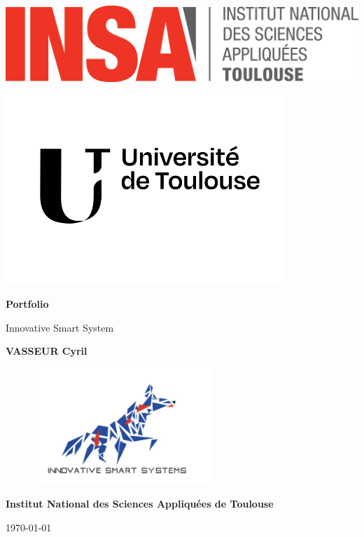 \documentclass[a4paper,12pt]{report}
\begin{document}
\raggedbottom
\begin{titlepage}
    \centering

    
    \noindent 
    \begin{minipage}{0.5\textwidth}
        \includegraphics[width=0.5\linewidth]{image/Logo_INSAToulouse-quadri.png} 
    \end{minipage}%
    \hfill 
    \begin{minipage}{0.5\textwidth}
        \flushright 
        \includegraphics[width=0.5\linewidth]{image/logo_universite_toulouse.png}
    \end{minipage}


    \vspace*{2cm} 
    {\Huge\bfseries Portfolio \par}
    \vspace{1cm}
    {\huge Innovative Smart System \par}
    \vspace{2cm}
    {\Large \textbf{VASSEUR Cyril} \par}
    \vspace{2cm}

    \begin{figure}[H]
        \centering
        \includegraphics[width=0.6\textwidth]{image/LOGO_ISS.png}
    \end{figure}
    
    \vfill
    {\Large \textbf{Institut National des Sciences Appliquées de Toulouse} \par}
    \vspace{1cm}
    {\large \today \par}
\end{titlepage}
\end{document}
